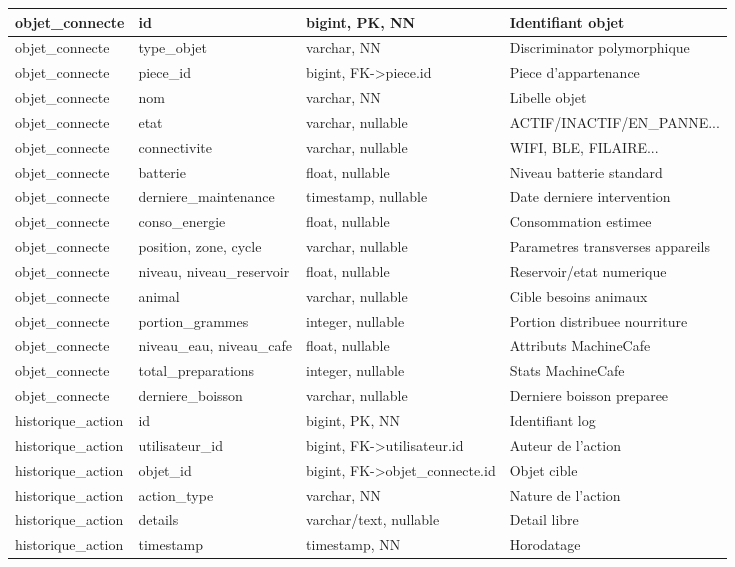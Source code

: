 \documentclass[11pt,a4paper]{article}
\begin{document}
\begin{longtable}{|p{3.0cm}|p{4.0cm}|p{4.1cm}|p{4.7cm}|}
objet\_connecte & id & bigint, PK, NN & Identifiant objet \\
\hline
objet\_connecte & type\_objet & varchar, NN & Discriminator polymorphique \\
\hline
objet\_connecte & piece\_id & bigint, FK->piece.id & Piece d'appartenance \\
\hline
objet\_connecte & nom & varchar, NN & Libelle objet \\
\hline
objet\_connecte & etat & varchar, nullable & ACTIF/INACTIF/EN\_PANNE... \\
\hline
objet\_connecte & connectivite & varchar, nullable & WIFI, BLE, FILAIRE... \\
\hline
objet\_connecte & batterie & float, nullable & Niveau batterie standard \\
\hline
objet\_connecte & derniere\_maintenance & timestamp, nullable & Date derniere intervention \\
\hline
objet\_connecte & conso\_energie & float, nullable & Consommation estimee \\
\hline
objet\_connecte & position, zone, cycle & varchar, nullable & Parametres transverses appareils \\
\hline
objet\_connecte & niveau, niveau\_reservoir & float, nullable & Reservoir/etat numerique \\
\hline
objet\_connecte & animal & varchar, nullable & Cible besoins animaux \\
\hline
objet\_connecte & portion\_grammes & integer, nullable & Portion distribuee nourriture \\
\hline
objet\_connecte & niveau\_eau, niveau\_cafe & float, nullable & Attributs MachineCafe \\
\hline
objet\_connecte & total\_preparations & integer, nullable & Stats MachineCafe \\
\hline
objet\_connecte & derniere\_boisson & varchar, nullable & Derniere boisson preparee \\
\hline

historique\_action & id & bigint, PK, NN & Identifiant log \\
\hline
historique\_action & utilisateur\_id & bigint, FK->utilisateur.id & Auteur de l'action \\
\hline
historique\_action & objet\_id & bigint, FK->objet\_connecte.id & Objet cible \\
\hline
historique\_action & action\_type & varchar, NN & Nature de l'action \\
\hline
historique\_action & details & varchar/text, nullable & Detail libre \\
\hline
historique\_action & timestamp & timestamp, NN & Horodatage \\
\hline


\end{longtable}
\end{document}
